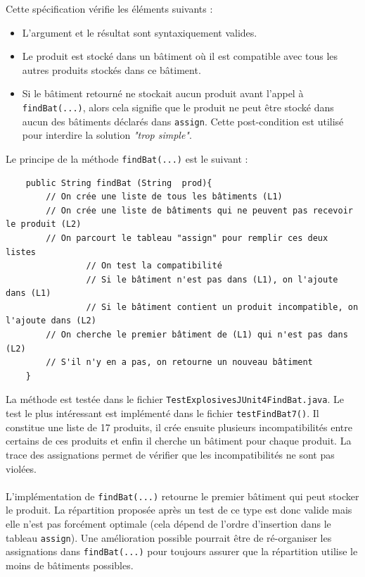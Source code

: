 \documentclass{article}
\begin{document}
\noindent
Cette spécification vérifie les éléments suivants :
\begin{itemize}
\item L'argument et le résultat sont syntaxiquement valides.
\item Le produit est stocké dans un bâtiment où il est compatible avec tous les autres produits stockés dans ce bâtiment.
\item Si le bâtiment retourné ne stockait aucun produit avant l'appel à \texttt{findBat(...)}, alors cela signifie que le produit ne peut être stocké dans aucun des bâtiments déclarés dans \texttt{assign}. Cette post-condition est utilisé pour interdire la solution \textit{"trop simple"}.
\end{itemize}

\newpage

\noindent
Le principe de la méthode \texttt{findBat(...)} est le suivant :

\vspace{0.2cm}
\noindent
\begin{verbatim}
    public String findBat (String  prod){
        // On crée une liste de tous les bâtiments (L1)
        // On crée une liste de bâtiments qui ne peuvent pas recevoir le produit (L2)
        // On parcourt le tableau "assign" pour remplir ces deux listes
                // On test la compatibilité
                // Si le bâtiment n'est pas dans (L1), on l'ajoute dans (L1)
                // Si le bâtiment contient un produit incompatible, on l'ajoute dans (L2)
        // On cherche le premier bâtiment de (L1) qui n'est pas dans (L2)
        // S'il n'y en a pas, on retourne un nouveau bâtiment
    }
\end{verbatim}
\vspace{0.2cm}

\noindent
La méthode est testée dans le fichier \texttt{TestExplosivesJUnit4FindBat.java}. Le test le plus intéressant est implémenté dans le fichier \texttt{testFindBat7()}. Il constitue une liste de 17 produits, il crée ensuite plusieurs incompatibilités entre certains de ces produits et enfin il cherche un bâtiment pour chaque produit. La trace des assignations permet de vérifier que les incompatibilités ne sont pas violées.

\paragraph{\danger} L'implémentation de \texttt{findBat(...)} retourne le premier bâtiment qui peut stocker le produit. La répartition proposée après un test de ce type est donc valide mais elle n'est pas forcément optimale (cela dépend de l'ordre d'insertion dans le tableau \texttt{assign}). Une amélioration possible pourrait être de ré-organiser les assignations dans \texttt{findBat(...)} pour toujours assurer que la répartition utilise le moins de bâtiments possibles.
\end{document}
